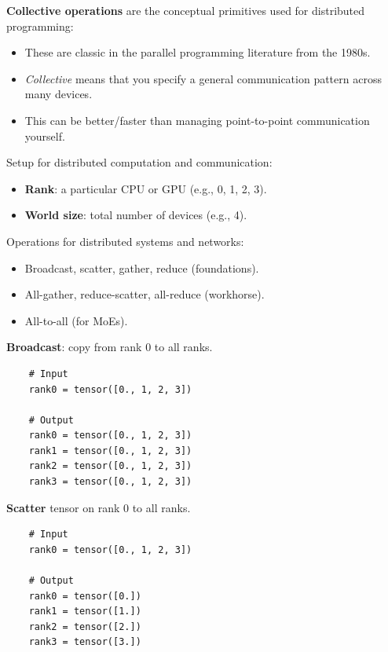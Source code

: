 \documentclass[12pt,twoside]{article}
\begin{document}
\textbf{Collective operations} are the conceptual primitives used for distributed programming:

\begin{itemize}
    \item These are classic in the parallel programming literature from the 1980s.
    \item \textit{Collective} means that you specify a general communication pattern across many devices.
    \item This can be better/faster than managing point-to-point communication yourself.
\end{itemize}

Setup for distributed computation and communication:

\begin{itemize}
    \item \textbf{Rank}: a particular CPU or GPU (e.g., 0, 1, 2, 3).
    \item \textbf{World size}: total number of devices (e.g., 4).
\end{itemize}

Operations for distributed systems and networks:

\begin{itemize}
    \item Broadcast, scatter, gather, reduce (foundations).
    \item All-gather, reduce-scatter, all-reduce (workhorse).
    \item All-to-all (for MoEs).
\end{itemize}

\textbf{Broadcast}: copy from rank 0 to all ranks.

\begin{verbatim}
    # Input
    rank0 = tensor([0., 1, 2, 3])
    
    # Output
    rank0 = tensor([0., 1, 2, 3])
    rank1 = tensor([0., 1, 2, 3])
    rank2 = tensor([0., 1, 2, 3])
    rank3 = tensor([0., 1, 2, 3])
\end{verbatim}

\textbf{Scatter} tensor on rank 0 to all ranks.

\begin{verbatim}
    # Input
    rank0 = tensor([0., 1, 2, 3])
    
    # Output
    rank0 = tensor([0.])
    rank1 = tensor([1.])
    rank2 = tensor([2.])
    rank3 = tensor([3.])
\end{verbatim}
\end{document}
